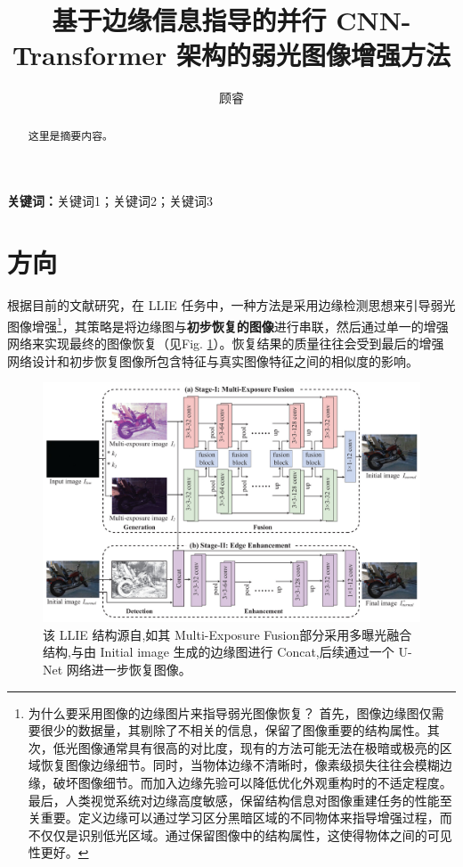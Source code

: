 \documentclass[a4paper]{ctexart}
\title{\heiti\zihao{3} 基于边缘信息指导的并行 CNN-Transformer 架构的弱光图像增强方法}
\author[1]{\fangsong\zihao{5}\authorsize 顾睿}
\affil[ ]{\songti\zihao{-5}（1. 兰州大学信息科学与工程学院，747000）}
\date{} %
\newcommand{\abstractsize}{\fontsize{9pt}{16pt}\selectfont}
\newcommand{\keywordsize}{\fontsize{9pt}{16pt}\selectfont}
\begin{document}
	
\maketitle
	 
\begin{abstract}
	\abstractsize
	这里是摘要内容。
\end{abstract}
	
\textbf{关键词：}\keywordsize 关键词1；关键词2；关键词3
	
\section{方向}
	
	根据目前的文献研究，在 LLIE 任务中，一种方法是采用边缘检测思想来引导弱光图像增强\footnote{为什么要采用图像的边缘图片来指导弱光图像恢复？
		首先，图像边缘图仅需要很少的数据量，其剔除了不相关的信息，保留了图像重要的结构属性。其次，低光图像通常具有很高的对比度，现有的方法可能无法在极暗或极亮的区域恢复图像边缘细节。同时，当物体边缘不清晰时，像素级损失往往会模糊边缘，破坏图像细节。而加入边缘先验可以降低优化外观重构时的不适定程度。最后，人类视觉系统对边缘高度敏感，保留结构信息对图像重建任务的性能至关重要。定义边缘可以通过学习区分黑暗区域的不同物体来指导增强过程，而不仅仅是识别低光区域。通过保留图像中的结构属性，这使得物体之间的可见性更好。}，其策略是将边缘图与\textbf{初步恢复的图像}进行串联，然后通过单一的增强网络来实现最终的图像恢复（见Fig. \ref{fig: EEMEFN}）。恢复结果的质量往往会受到最后的增强网络设计和初步恢复图像所包含特征与真实图像特征之间的相似度的影响。
	
	\begin{figure}[htbp]
		\centering 
		\includegraphics[width=\columnwidth]{picture/LLIE/EEMEFN/EEMEFN framework}
		\caption{
			\label{fig: EEMEFN} 
			该 LLIE 结构源自\cite{zhu2020eemefn},如其 Multi-Exposure Fusion部分采用多曝光融合结构,与由 Initial image 生成的边缘图进行 Concat,后续通过一个 U-Net 网络进一步恢复图像。
		}
	\end{figure}
	
\end{document}
